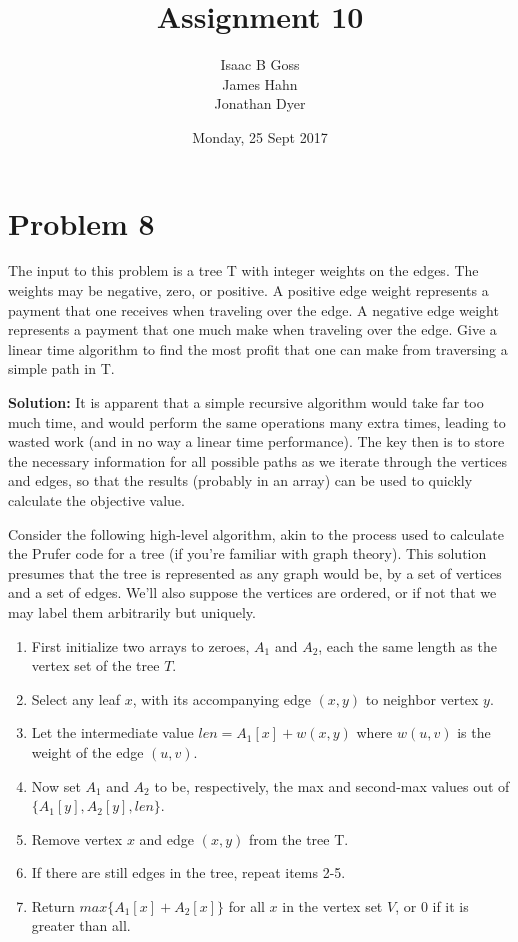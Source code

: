 \documentclass{article}
\author{Isaac B Goss\\ James Hahn\\ Jonathan Dyer}
\title{Assignment 10}
\date{Monday, 25 Sept 2017}
\providecommand{\prob}[1]{\section*{Problem #1}}
\providecommand{\soln}{\textbf{Solution: }}
\providecommand{\tightlist}{
    \setlength{\itemsep}{0pt}\setlength{\parskip}{0pt}
}
\begin{document}
\maketitle

\prob{8}
The input to this problem is a tree T with integer weights on the edges. The weights may be negative, zero, or positive. A positive edge weight represents a payment that one receives when traveling over the edge. A negative edge weight represents a payment that one much make when traveling over the edge. Give a linear time algorithm to find the most profit that one can make from traversing a simple path in T.

\soln
It is apparent that a simple recursive algorithm would take far too much time, and would perform the same operations many extra times, leading to wasted work (and in no way a linear time performance). The key then is to store the necessary information for all possible paths as we iterate through the vertices and edges, so that the results (probably in an array) can be used to quickly calculate the objective value.

Consider the following high-level algorithm, akin to the process used to calculate the Prufer code for a tree (if you're familiar with graph theory). This solution presumes that the tree is represented as any graph would be, by a set of vertices and a set of edges. We'll also suppose the vertices are ordered, or if not that we may label them arbitrarily but uniquely.
\begin{enumerate}\tightlist
 \item First initialize two arrays to zeroes, $A_1$ and $A_2$, each the same length as the vertex set of the tree $T$.
 \item Select any leaf $x$, with its accompanying edge $(x,y)$ to neighbor vertex $y$.
 \item Let the intermediate value $len = A_1[x] + w(x,y)$ where $w(u,v)$ is the weight of the edge $(u,v)$.
 \item Now set $A_1$ and $A_2$ to be, respectively, the max and second-max values out of $\{A_1[y],A_2[y],len\}$.
 \item Remove vertex $x$ and edge $(x,y)$ from the tree T.
 \item If there are still edges in the tree, repeat items 2-5.
 \item Return $max\{A_1[x] + A_2[x]\}$ for all $x$ in the vertex set $V$, or $0$ if it is greater than all.
\end{enumerate}
\end{document}
